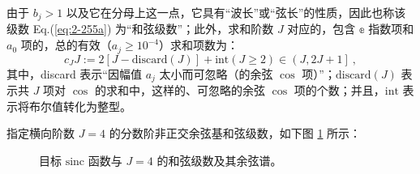 由于 $b_j > 1$ 以及它在分母上这一点，它具有“波长”或“弦长”的性质，因此也称该级数 Eq.(\ref{eq:2-255a}) 为“和弦级数”；此外，求和阶数 $J$ 对应的，包含 $\mathbb{e}$ 指数项和 $a_0$ 项的，总的有效（$ a_j \geq 10^{-4} $）求和项数为：
\begin{equation} \label{eq:2-257}
	c_J J := 2 \left[ J - \text{discard} \left( J \right) \right] + \text{int} \left( J \geq 2 \right) \in \left( J, 2J + 1 \right] ~,
\end{equation}
其中，discard 表示“因幅值 $a_j$ 太小而可忽略（的余弦 $\cos$ 项）”；$\text{discard}(J)$ 表示共 $J$ 项对 $\cos$ 的求和中，这样的、可忽略的余弦 $\cos$ 项的个数；并且，$\text{int}$ 表示将布尔值转化为整型。

指定横向阶数 $J = 4$ 的分数阶非正交余弦基和弦级数，如下图 \ref{fig:2-3} 所示：
\begin{figure}[htbp]
	\abovedisplayskip=0pt
	\belowdisplayskip=0pt
	\caption{\label{fig:2-3} 目标 $\text{sinc}$ 函数与 $J = 4$ 的和弦级数及其余弦谱。}
\end{figure}

